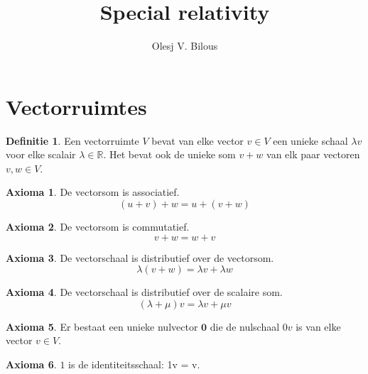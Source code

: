 \documentclass{amsart}
\theoremstyle{definition}
\newtheorem{axm}{Axioma}[section]
\newtheorem{dfn}{Definitie}[section]
\newcommand{\realnums}{\mathbb{R}}
\newcommand{\zerovec}{\mathbf{0}}
\begin{document}
\title{Special relativity}
\author{Olesj V. Bilous}
\maketitle

\section{Vectorruimtes}

\begin{dfn}
	Een vectorruimte $V$ bevat van elke vector $v \in V$ een unieke schaal $\lambda v$ voor elke scalair $\lambda \in \realnums$. Het bevat ook de unieke som $v + w$ van elk paar vectoren $v, w \in V$.
\end{dfn}

\begin{axm}
	De vectorsom is associatief.
	\begin{equation*}
		(u + v) + w = u + (v + w)
	\end{equation*}
\end{axm}

\begin{axm}
	De vectorsom is commutatief.
	\begin{equation*}
		v + w = w + v
	\end{equation*}
\end{axm}

\begin{axm}
	De vectorschaal is distributief over de vectorsom.
	\begin{equation*}
		\lambda(v + w) = \lambda v + \lambda w
	\end{equation*}
\end{axm}

\begin{axm}
	De vectorschaal is distributief over de scalaire som.
	\begin{equation*}
		(\lambda + \mu)v = \lambda v + \mu v
	\end{equation*}
\end{axm}

\begin{axm}
	Er bestaat een unieke nulvector $\zerovec$ die de nulschaal $0v$ is van elke vector $v \in V$.
\end{axm}

\begin{axm}
	$1$ is de identiteitsschaal: 1v = v.
\end{axm}
\end{document}
